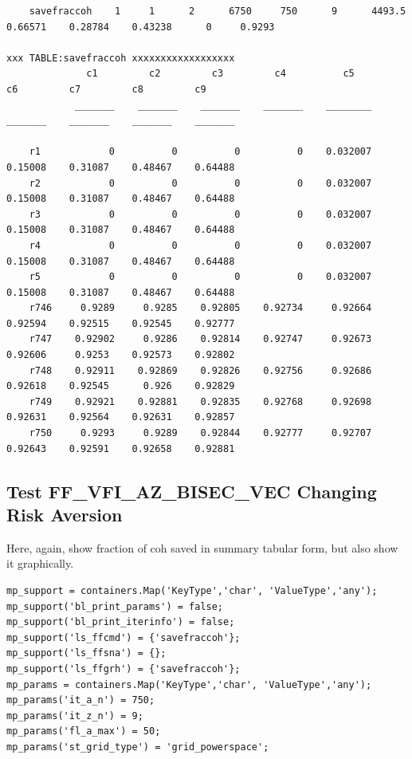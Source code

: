 \documentclass[
]{book}
\begin{document}
\begin{verbatim}
    savefraccoh    1     1      2      6750     750      9      4493.5    0.66571    0.28784    0.43238      0     0.9293

xxx TABLE:savefraccoh xxxxxxxxxxxxxxxxxx
              c1         c2         c3         c4          c5         c6         c7         c8         c9   
            _______    _______    _______    _______    ________    _______    _______    _______    _______

    r1            0          0          0          0    0.032007    0.15008    0.31087    0.48467    0.64488
    r2            0          0          0          0    0.032007    0.15008    0.31087    0.48467    0.64488
    r3            0          0          0          0    0.032007    0.15008    0.31087    0.48467    0.64488
    r4            0          0          0          0    0.032007    0.15008    0.31087    0.48467    0.64488
    r5            0          0          0          0    0.032007    0.15008    0.31087    0.48467    0.64488
    r746     0.9289     0.9285    0.92805    0.92734     0.92664    0.92594    0.92515    0.92545    0.92777
    r747    0.92902     0.9286    0.92814    0.92747     0.92673    0.92606     0.9253    0.92573    0.92802
    r748    0.92911    0.92869    0.92826    0.92756     0.92686    0.92618    0.92545      0.926    0.92829
    r749    0.92921    0.92881    0.92835    0.92768     0.92698    0.92631    0.92564    0.92631    0.92857
    r750     0.9293     0.9289    0.92844    0.92777     0.92707    0.92643    0.92591    0.92658    0.92881
\end{verbatim}

\hypertarget{test-ff_vfi_az_bisec_vec-changing-risk-aversion}{%
\subsection{Test FF\_VFI\_AZ\_BISEC\_VEC Changing Risk Aversion}\label{test-ff_vfi_az_bisec_vec-changing-risk-aversion}}

Here, again, show fraction of coh saved in summary tabular form, but
also show it graphically.

\begin{verbatim}
mp_support = containers.Map('KeyType','char', 'ValueType','any');
mp_support('bl_print_params') = false;
mp_support('bl_print_iterinfo') = false;
mp_support('ls_ffcmd') = {'savefraccoh'};
mp_support('ls_ffsna') = {};
mp_support('ls_ffgrh') = {'savefraccoh'};
mp_params = containers.Map('KeyType','char', 'ValueType','any');
mp_params('it_a_n') = 750;
mp_params('it_z_n') = 9;
mp_params('fl_a_max') = 50;
mp_params('st_grid_type') = 'grid_powerspace';
\end{verbatim}
\end{document}
